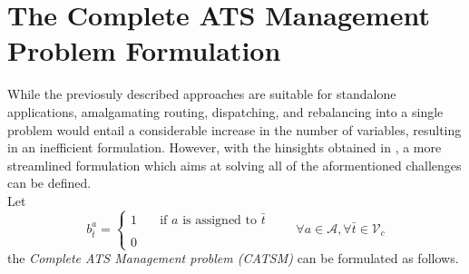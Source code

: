 \section{The Complete ATS Management Problem Formulation}\label{sec:catsm}
While the previosuly described approaches are suitable for standalone applications, amalgamating routing, dispatching, and rebalancing into a single problem would entail a considerable increase in the number of variables, resulting in an inefficient formulation. However, with the hinsights obtained in , a more streamlined formulation which aims at solving all of the aformentioned challenges can be defined. \\
Let 
\begin{equation*}
	b_{\bar{t}}^a = 
	\begin{cases} 
		1 & \quad \text{if $a$ is assigned to }\bar{t} \\
		\\
		0
	\end{cases}
	\quad\quad \forall a \in \mathcal{A}, \forall \bar{t} \in \mathcal{V}_c
	\label{eq:assignment}
\end{equation*}
the \textit{Complete ATS Management problem (CATSM)} can be formulated as follows. \\

